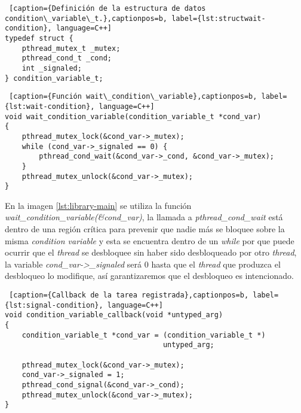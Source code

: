 \smallskip

\begin{minipage}{\linewidth}
\begin{lstlisting} [caption={Definición de la estructura de datos condition\_variable\_t.},captionpos=b, label={lst:structwait-condition}, language=C++]
typedef struct {
    pthread_mutex_t _mutex;
    pthread_cond_t _cond;
    int _signaled;
} condition_variable_t;
\end{lstlisting}
\end{minipage}

\smallskip

\begin{minipage}{\linewidth}
\begin{lstlisting} [caption={Función wait\_condition\_variable},captionpos=b, label={lst:wait-condition}, language=C++]
void wait_condition_variable(condition_variable_t *cond_var)
{
    pthread_mutex_lock(&cond_var->_mutex);
    while (cond_var->_signaled == 0) {
        pthread_cond_wait(&cond_var->_cond, &cond_var->_mutex);
    }
    pthread_mutex_unlock(&cond_var->_mutex);
}
\end{lstlisting}
\end{minipage}

En la imagen \ref{lst:library-main} se utiliza la función \textit{wait\_condition\_variable(\&cond\_var)}, la llamada a  \textit{pthread\_cond\_wait} está dentro de una región crítica para prevenir que nadie más se bloquee sobre la misma \textit{condition variable} y esta se encuentra dentro de un \textit{while} por que puede ocurrir que el \textit{thread} se desbloquee sin haber sido desbloqueado por otro \textit{thread}, la variable \textit{cond\_var->\_signaled} será 0 hasta que el \textit{thread} que produzca el desbloqueo lo modifique, así garantizaremos que el desbloqueo es intencionado.

\bigskip

\begin{minipage}{\linewidth}
\begin{lstlisting} [caption={Callback de la tarea registrada},captionpos=b, label={lst:signal-condition}, language=C++]
void condition_variable_callback(void *untyped_arg)
{
    condition_variable_t *cond_var = (condition_variable_t *) 
    								 untyped_arg;

    pthread_mutex_lock(&cond_var->_mutex);
    cond_var->_signaled = 1;
    pthread_cond_signal(&cond_var->_cond);
    pthread_mutex_unlock(&cond_var->_mutex);
}
\end{lstlisting}
\end{minipage}

